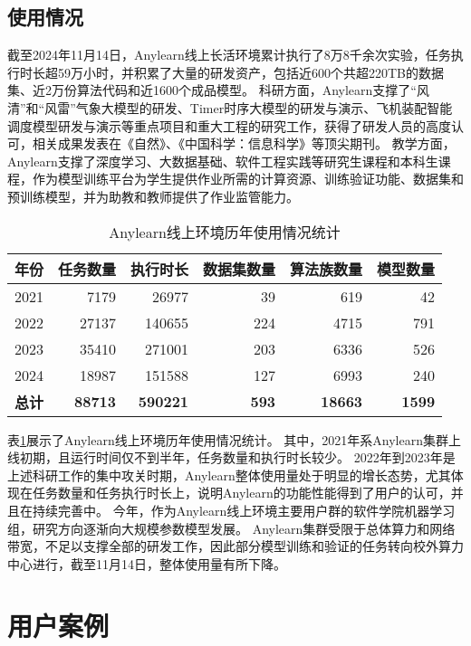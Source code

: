 \subsection{使用情况}
截至2024年11月14日，Anylearn线上长活环境累计执行了8万8千余次实验，任务执行时长超59万小时，并积累了大量的研发资产，包括近600个共超220TB的数据集、近2万份算法代码和近1600个成品模型。
科研方面，Anylearn支撑了“风清”和“风雷”气象大模型的研发、Timer时序大模型的研发与演示、飞机装配智能调度模型研发与演示等重点项目和重大工程的研究工作，获得了研发人员的高度认可，相关成果发表在《自然》\cite{Zha23}、《中国科学：信息科学》\cite{Zho24}等顶尖期刊。
教学方面，Anylearn支撑了深度学习、大数据基础、软件工程实践等研究生课程和本科生课程，作为模型训练平台为学生提供作业所需的计算资源、训练验证功能、数据集和预训练模型，并为助教和教师提供了作业监管能力。

\begin{table}
  \centering
  \caption{Anylearn线上环境历年使用情况统计}
  \begin{tabular}{crrrrr}
    \toprule
    \multicolumn{1}{c}{年份} & \multicolumn{1}{c}{任务数量} & \multicolumn{1}{c}{执行时长} & \multicolumn{1}{c}{数据集数量} & \multicolumn{1}{c}{算法族数量} & \multicolumn{1}{c}{模型数量} \\
    \midrule
    2021 & 7179 & 26977 & 39 & 619 & 42 \\
    2022 & 27137 & 140655 & 224 & 4715 & 791 \\
    2023 & 35410 & 271001 & 203 & 6336 & 526 \\
    2024 & 18987 & 151588 & 127 & 6993 & 240 \\
    \textbf{总计} & \textbf{88713} & \textbf{590221} & \textbf{593} & \textbf{18663} & \textbf{1599} \\
    \bottomrule
  \end{tabular}
  \label{tab:stats}
\end{table}

表\ref{tab:stats}展示了Anylearn线上环境历年使用情况统计。
其中，2021年系Anylearn集群上线初期，且运行时间仅不到半年，任务数量和执行时长较少。
2022年到2023年是上述科研工作的集中攻关时期，Anylearn整体使用量处于明显的增长态势，尤其体现在任务数量和任务执行时长上，说明Anylearn的功能性能得到了用户的认可，并且在持续完善中。
今年，作为Anylearn线上环境主要用户群的软件学院机器学习组，研究方向逐渐向大规模参数模型发展。
Anylearn集群受限于总体算力和网络带宽，不足以支撑全部的研发工作，因此部分模型训练和验证的任务转向校外算力中心进行，截至11月14日，整体使用量有所下降。


\section{用户案例}

